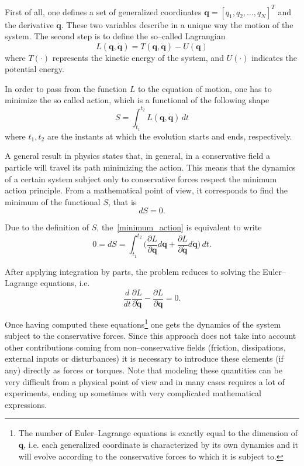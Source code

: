 \documentclass[11pt]{article}
\begin{document}
First of all, one defines a set of generalized coordinates $\bm{q} = [q_1, q_2, \dots, q_N]^T$ and the derivative $\dot{\bm{q}}$. These two variables describe in a unique way the motion of the system. The second step is to define the so--called Lagrangian
\begin{equation}
L(\bm{q},\dot{\bm{q}}) = T(\bm{q},\dot{\bm{q}}) - U(\bm{q})
\label{lagrangian}
\end{equation}
where $T(\cdot)$ represents the kinetic energy of the system, and $U(\cdot)$ indicates the potential energy.

In order to pass from the function $L$ to the equation of motion, one has to minimize the so called action, which is a functional of the following shape
\begin{equation}
S = \int_{t_1}^{t_2} L(\bm{q},\dot{\bm{q}}) \, dt
\label{action_functional}
\end{equation}
where $t_1, t_2$ are the instants at which the evolution starts and ends, respectively.

A general result in physics states that, in general, in a conservative field a particle will travel its path minimizing the action. This means that the dynamics of a certain system subject only to conservative forces respect the minimum action principle. From a mathematical point of view, it corresponds to find the minimum of the functional $S$, that is
\begin{equation}
dS = 0.
\label{minimum_action}
\end{equation}

Due to the definition of $S$, the~\eqref{minimum_action} is equivalent to write
\[
0 = dS = \int_{t_1}^{t_2} \Biggl( \dfrac{\partial L}{\partial \bm{q}}d\bm{q} + \dfrac{\partial L}{\partial \dot{\bm{q}}}d\dot{\bm{q}}\Biggr) \, dt.
\]

After applying integration by parts, the problem reduces to solving the Euler--Lagrange equations, i.e.
\begin{equation}
\dfrac{d}{dt} \dfrac{\partial L}{\partial \dot{\bm{q}}} - \dfrac{\partial L}{\partial \bm{q}} = 0.
\label{euler_lagrange}
\end{equation}

Once having computed these equations\footnote{The number of Euler--Lagrange equations is exactly equal to the dimension of $\bm{q}$, i.e. each generalized coordinate is characterized by its own dynamics and it will evolve according to the conservative forces to which it is subject to.} one gets the dynamics of the system subject to the conservative forces. Since this approach does not take into account other contributions coming from non--conservative fields (friction, dissipations, external inputs or disturbances) it is necessary to introduce these elements (if any) directly as forces or torques. Note that modeling these quantities can be very difficult from a physical point of view and in many cases requires a lot of experiments, ending up sometimes with very complicated mathematical expressions.
\end{document}
